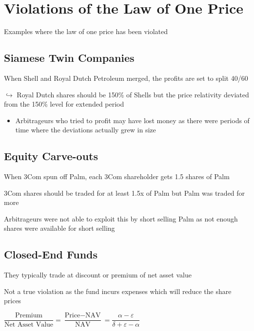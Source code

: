 \documentclass[]{book}
\providecommand{\tightlist}{%
  \setlength{\itemsep}{0pt}\setlength{\parskip}{0pt}}
\theoremstyle{definition}
\theoremstyle{definition}
\theoremstyle{remark}
\begin{document}
\section{Violations of the Law of One
Price}\label{violations-of-the-law-of-one-price}

Examples where the law of one price has been violated

\subsection{Siamese Twin Companies}\label{siamese-twin-companies}

When Shell and Royal Dutch Petroleum merged, the profits are set to
split 40/60

\(\hookrightarrow\) Royal Dutch shares should be 150\% of Shells but the
price relativity deviated from the 150\% level for extended period

\begin{itemize}
\tightlist
\item
  Arbitrageurs who tried to profit may have lost money as there were
  periods of time where the deviations actually grew in size
\end{itemize}

\subsection{Equity Carve-outs}\label{equity-carve-outs}

When 3Com spun off Palm, each 3Com shareholder gets 1.5 shares of Palm

3Com shares should be traded for at least 1.5x of Palm but Palm was
traded for more

Arbitrageurs were not able to exploit this by short selling Palm as not
enough shares were available for short selling

\subsection{Closed-End Funds}\label{closed-end-funds}

They typically trade at discount or premium of net asset value

Not a true violation as the fund incurs expenses which will reduce the
share prices

\(\dfrac{\text{Premium}}{\text{Net Asset Value}} = \dfrac{\text{Price} - \text{NAV}}{\text{NAV}} = \dfrac{\alpha - \varepsilon}{\delta + \varepsilon - \alpha}\)
\end{document}
